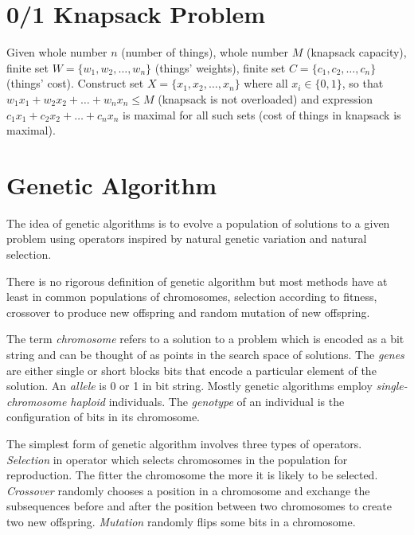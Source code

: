 \documentclass{article}
\begin{document}

\section{0/1 Knapsack Problem}

Given whole number $n$ (number of things),
whole number $M$ (knapsack capacity),
finite set $W = \{w_1, w_2, \dots , w_n\}$ (things' weights),
finite set $C = \{c_1, c_2, \dots , c_n\}$ (things' cost).
Construct set $X = \{x_1, x_2, \dots , x_n\}$ where all $x_i \in \{0, 1\}$,
so that $w_1 x_1 + w_2 x_2 + \dots + w_n x_n \leq M$
(knapsack is not overloaded)
and expression $c_1 x_1 + c_2 x_2 + \dots + c_n x_n$ is maximal for all such
sets (cost of things in knapsack is maximal).

\section{Genetic Algorithm}

The idea of genetic algorithms is to evolve a population of solutions
to a given problem using operators inspired by natural genetic variation
and natural selection.
\cite{mitchell1996}

There is no rigorous definition of genetic algorithm but most methods
have at least in common populations of chromosomes,
selection according to fitness, crossover to produce new offspring
and random mutation of new offspring.
\cite{mitchell1996}

The term \textit{chromosome} refers to a solution to a problem
which is encoded as a bit string
and can be thought of as points in the search space of solutions.
The \textit{genes} are either single or short blocks bits
that encode a particular element of the solution.
An \textit{allele} is 0 or 1 in bit string.
Mostly genetic algorithms employ \textit{single-chromosome haploid} individuals.
The \textit{genotype} of an individual is the configuration of bits
in its chromosome.
\cite{mitchell1996}

The simplest form of genetic algorithm involves three types of operators.
\textit{Selection} in operator which selects chromosomes in the population for
reproduction.
The fitter the chromosome the more it is likely to be selected.
\textit{Crossover} randomly chooses a position in a chromosome
and exchange the subsequences before and after the position between
two chromosomes to create two new offspring.
\textit{Mutation} randomly flips some bits in a chromosome.
\cite{mitchell1996}
\end{document}
